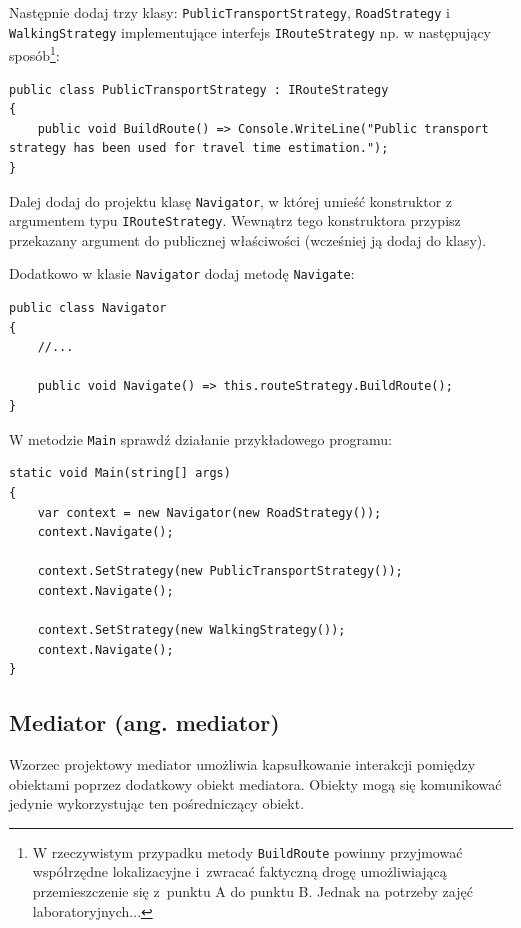 Następnie dodaj trzy klasy: \texttt{PublicTransportStrategy}, \texttt{RoadStrategy} i \texttt{WalkingStrategy} implementujące interfejs \texttt{IRouteStrategy} np. w następujący sposób\footnote{W rzeczywistym przypadku metody \texttt{BuildRoute} powinny przyjmować współrzędne lokalizacyjne i~zwracać faktyczną drogę umożliwiającą przemieszczenie się z~punktu A do punktu B. Jednak na potrzeby zajęć laboratoryjnych...}:
\begin{lstlisting}
public class PublicTransportStrategy : IRouteStrategy
{
	public void BuildRoute() => Console.WriteLine("Public transport strategy has been used for travel time estimation.");
}
\end{lstlisting}

Dalej dodaj do projektu klasę \texttt{Navigator}, w której umieść konstruktor z argumentem typu \texttt{IRouteStrategy}. Wewnątrz tego konstruktora przypisz przekazany argument do publicznej właściwości (wcześniej ją dodaj do klasy). 

Dodatkowo w klasie \texttt{Navigator} dodaj metodę \texttt{Navigate}:
\begin{lstlisting}
public class Navigator
{
	//...
	
	public void Navigate() => this.routeStrategy.BuildRoute(); 
}
\end{lstlisting}

W metodzie \texttt{Main} sprawdź działanie przykładowego programu:
\begin{lstlisting}
static void Main(string[] args)
{
	var context = new Navigator(new RoadStrategy());
	context.Navigate();
	
	context.SetStrategy(new PublicTransportStrategy());
	context.Navigate();
	
	context.SetStrategy(new WalkingStrategy());
	context.Navigate();
}
\end{lstlisting}

\subsection{Mediator (ang. mediator)}

Wzorzec projektowy mediator umożliwia kapsułkowanie interakcji pomiędzy obiektami poprzez dodatkowy obiekt mediatora. Obiekty mogą się komunikować jedynie wykorzystując ten pośredniczący obiekt.


